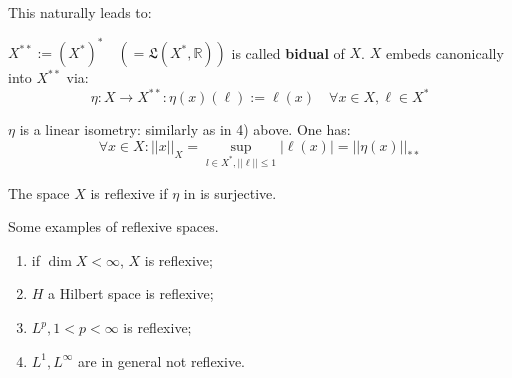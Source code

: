 \documentclass{article}
\begin{document}
This naturally leads to:

\begin{definition}[Bidual]
\label{bidual defnition}
    $X^{**} := (X^*)^* \quad (=\mathfrak{L}(X^*,\mathbb{R}))$ is called \textbf{bidual} of $X$. $X$ embeds canonically into $X^{**}$ via: $$ \eta : X\rightarrow X^{**}: \eta(x)(\ell) := \ell(x) \quad \forall x \in X, \ell \in X^*$$ 
\end{definition}
\begin{remark}
    $\eta$ is a linear isometry: similarly as in  4) above. One has: $$\forall x \in X: ||x||_X = \sup_{l\in X^*, ||\ell|| \leq 1} |\ell(x)| = ||\eta(x)||_{**}$$
\end{remark}

\begin{definition}[Reflexive]
    The space $X$ is reflexive if $\eta$ in  is surjective.
\end{definition}

\begin{example}
\label{reflexive examples}
Some examples of reflexive spaces.  
\begin{enumerate}
    \item if $\dim X<\infty$, $X$ is reflexive;
    \item $H$ a Hilbert space is reflexive;
    \item $L^p, 1<p<\infty$ is reflexive;
    \item $L^1, L^\infty$ are in general not reflexive.
\end{enumerate}
\end{example}
\end{document}
